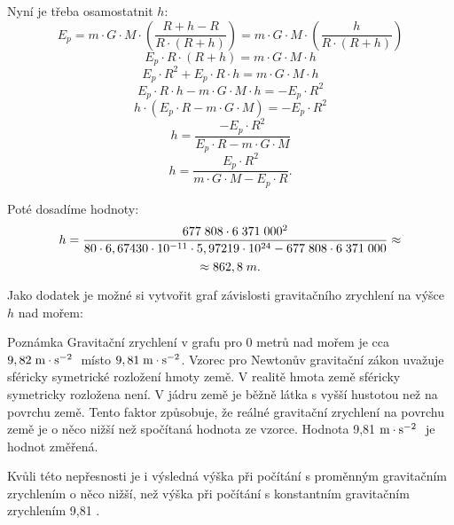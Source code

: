 \documentclass{article}
\begin{document}
Nyní je třeba osamostatnit $h$:
$$
    E_p = m \cdot G \cdot M \cdot \left( \frac{R + h - R}{R \cdot (R + h)} \right) = m \cdot G \cdot M \cdot \left( \frac{h}{R \cdot (R + h)} \right)
$$
$$
    E_p \cdot R \cdot (R + h) = m \cdot G \cdot M \cdot h
$$
$$
    E_p \cdot R^2 + E_p \cdot R \cdot h = m \cdot G \cdot M \cdot h
$$
$$
    E_p \cdot R \cdot h - m \cdot G \cdot M \cdot h = - E_p \cdot R^2
$$
$$
    h \cdot (E_p \cdot R - m \cdot G \cdot M) = - E_p \cdot R^2
$$
$$
    h = \frac{- E_p \cdot R^2}{E_p \cdot R - m \cdot G \cdot M}
$$
$$
    h = \frac{E_p \cdot R^2}{m \cdot G \cdot M - E_p \cdot R}.
$$

Poté dosadíme hodnoty:
$$
    h = \frac{677 \; 808 \cdot 6 \; 371 \; 000^2}{80 \cdot 6,67430 \cdot 10^{-11} \cdot 5,97219 \cdot 10^{24} - 677 \; 808 \cdot 6 \; 371 \; 000} \approx
$$
$$
    \approx 862,8 \; m.
$$

Jako dodatek je možné si vytvořit graf závislosti gravitačního zrychlení na výšce $h$ nad mořem:
\begin{center}
\end{center}

\begin{notebox}{Poznámka}
    Gravitační zrychlení v grafu pro 0 metrů nad mořem je cca $9,82 \; \textrm{m} \cdot \textrm{s}^{-2} \;$ místo $9,81 \; \textrm{m} \cdot \textrm{s}^{-2}$. Vzorec pro Newtonův gravitační zákon uvažuje sféricky symetrické rozložení hmoty země. V realitě hmota země sféricky symetricky rozložena není. V jádru země je běžně látka s vyšší hustotou než na povrchu země. Tento faktor způsobuje, že reálné gravitační zrychlení na povrchu země je o něco nižší než spočítaná hodnota ze vzorce. Hodnota 9,81 $\textrm{m} \cdot \textrm{s}^{-2} \;$ je hodnot změřená.

    Kvůli této nepřesnosti je i výsledná výška při počítání s proměnným gravitačním zrychlením o něco nižší, než výška při počítání s konstantním gravitačním zrychlením 9,81 \ueqMandSinvsq.
\end{notebox}
\end{document}

